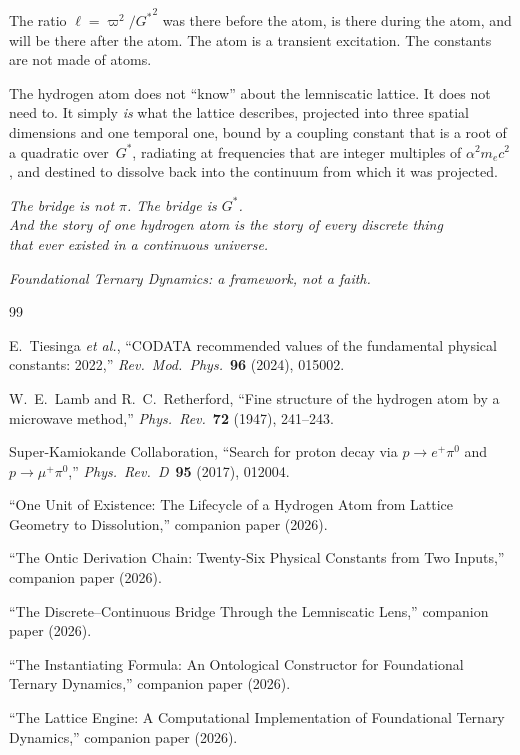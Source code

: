 \documentclass[11pt,a4paper]{article}
\newcommand{\Gstar}{{G^{*}}}
\newcommand{\vpi}{\varpi}
\begin{document}
The ratio $\ell = \vpi^2/\Gstar^2$ was there before the atom, is there during the atom, and will be there after the atom. The atom is a transient excitation. The constants are not made of atoms.

The hydrogen atom does not ``know'' about the lemniscatic lattice. It does not need to. It simply \emph{is} what the lattice describes, projected into three spatial dimensions and one temporal one, bound by a coupling constant that is a root of a quadratic over~$\Gstar$, radiating at frequencies that are integer multiples of $\alpha^2 m_e c^2$, and destined to dissolve back into the continuum from which it was projected.

\bigskip

\begin{center}\itshape
The bridge is not $\pi$. The bridge is $\Gstar$.\\[3pt]
And the story of one hydrogen atom is the story of every discrete thing\\
that ever existed in a continuous universe.
\end{center}

\medskip

\begin{center}
\textit{Foundational Ternary Dynamics: a framework, not a faith.}
\end{center}

\vfill

\begin{thebibliography}{99}

 E.~Tiesinga \textit{et al.}, ``CODATA recommended values of the fundamental physical constants: 2022,'' \textit{Rev.\ Mod.\ Phys.}\ \textbf{96} (2024), 015002.

 W.~E.~Lamb and R.~C.~Retherford, ``Fine structure of the hydrogen atom by a microwave method,'' \textit{Phys.\ Rev.}\ \textbf{72} (1947), 241--243.

 Super-Kamiokande Collaboration, ``Search for proton decay via $p \to e^+\pi^0$ and $p \to \mu^+\pi^0$,'' \textit{Phys.\ Rev.\ D}\ \textbf{95} (2017), 012004.

 ``One Unit of Existence: The Lifecycle of a Hydrogen Atom from Lattice Geometry to Dissolution,'' companion paper (2026).

 ``The Ontic Derivation Chain: Twenty-Six Physical Constants from Two Inputs,'' companion paper (2026).

 ``The Discrete--Continuous Bridge Through the Lemniscatic Lens,'' companion paper (2026).

 ``The Instantiating Formula: An Ontological Constructor for Foundational Ternary Dynamics,'' companion paper (2026).

 ``The Lattice Engine: A Computational Implementation of Foundational Ternary Dynamics,'' companion paper (2026).

\end{thebibliography}
\end{document}
